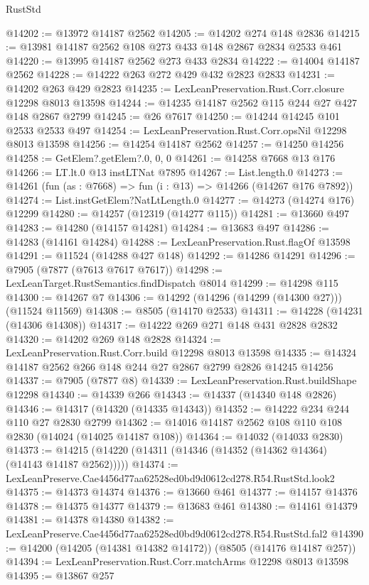 \begin{lexlean}{RustStd}
\begin{coremodule}
@14202 := @13972 @14187 @2562
@14205 := @14202 @274 @148 @2836
@14215 := @13981 @14187 @2562 @108 @273 @433 @148 @2867 @2834 @2533 @461
@14220 := @13995 @14187 @2562 @273 @433 @2834
@14222 := @14004 @14187 @2562
@14228 := @14222 @263 @272 @429 @432 @2823 @2833
@14231 := @14202 @263 @429 @2823
@14235 := LexLeanPreservation.Rust.Corr.closure @12298 @8013 @13598
@14244 := @14235 @14187 @2562 @115 @244 @27 @427 @148 @2867 @2799
@14245 := @26 @7617
@14250 := @14244 @14245 @101 @2533 @2533 @497
@14254 := LexLeanPreservation.Rust.Corr.opsNil @12298 @8013 @13598
@14256 := @14254 @14187 @2562
@14257 := @14250 @14256
@14258 := GetElem?.getElem?.{0, 0, 0}
@14261 := @14258 @7668 @13 @176
@14266 := LT.lt.{0} @13 instLTNat @7895
@14267 := List.length.{0}
@14273 := @14261 (fun (as : @7668) => fun (i : @13) => @14266 (@14267 @176 @7892))
@14274 := List.instGetElem?NatLtLength.{0}
@14277 := @14273 (@14274 @176) @12299
@14280 := @14257 (@12319 (@14277 @115))
@14281 := @13660 @497
@14283 := @14280 (@14157 @14281)
@14284 := @13683 @497
@14286 := @14283 (@14161 @14284)
@14288 := LexLeanPreservation.Rust.flagOf @13598
@14291 := @11524 (@14288 @427 @148)
@14292 := @14286 @14291
@14296 := @7905 (@7877 (@7613 @7617 @7617))
@14298 := LexLeanTarget.RustSemantics.findDispatch @8014
@14299 := @14298 @115
@14300 := @14267 @7
@14306 := @14292 (@14296 (@14299 (@14300 @27))) (@11524 @11569)
@14308 := @8505 (@14170 @2533)
@14311 := @14228 (@14231 (@14306 @14308))
@14317 := @14222 @269 @271 @148 @431 @2828 @2832
@14320 := @14202 @269 @148 @2828
@14324 := LexLeanPreservation.Rust.Corr.build @12298 @8013 @13598
@14335 := @14324 @14187 @2562 @266 @148 @244 @27 @2867 @2799 @2826 @14245 @14256
@14337 := @7905 (@7877 @8)
@14339 := LexLeanPreservation.Rust.buildShape @12298
@14340 := @14339 @266
@14343 := @14337 (@14340 @148 @2826)
@14346 := @14317 (@14320 (@14335 @14343))
@14352 := @14222 @234 @244 @110 @27 @2830 @2799
@14362 := @14016 @14187 @2562 @108 @110 @108 @2830 (@14024 (@14025 @14187 @108))
@14364 := @14032 (@14033 @2830)
@14373 := @14215 (@14220 (@14311 (@14346 (@14352 (@14362 @14364) (@14143 @14187 @2562)))))
@14374 := LexLeanPreserve.Cae4456d77aa62528ed0bd9d0612cd278.R54.RustStd.look2
@14375 := @14373 @14374
@14376 := @13660 @461
@14377 := @14157 @14376
@14378 := @14375 @14377
@14379 := @13683 @461
@14380 := @14161 @14379
@14381 := @14378 @14380
@14382 := LexLeanPreserve.Cae4456d77aa62528ed0bd9d0612cd278.R54.RustStd.fal2
@14390 := @14200 (@14205 (@14381 @14382 @14172)) (@8505 (@14176 @14187 @257))
@14394 := LexLeanPreservation.Rust.Corr.matchArms @12298 @8013 @13598
@14395 := @13867 @257

\end{coremodule}
\end{lexlean}
